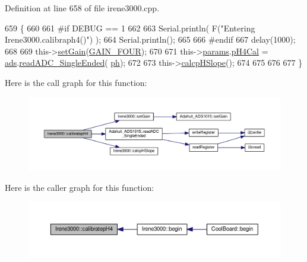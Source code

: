 Definition at line 658 of file irene3000.\+cpp.


\begin{DoxyCode}
659 \{
660 
661 \textcolor{preprocessor}{#if DEBUG == 1 }
662 
663     Serial.println( F(\textcolor{stringliteral}{"Entering Irene3000.calibraph4()"}) );
664     Serial.println();
665 
666 \textcolor{preprocessor}{#endif }
667     delay(1000);
668 
669     this->\hyperlink{class_irene3000_aff7c5da186b388e7272e63ff88a20c34}{setGain}(\hyperlink{_cool_adafruit___a_d_s1015_8h_a3d6c0e15829a207b9155890811fa4781a33fa5521f4e806b7438052fcdbbf8660}{GAIN\_FOUR});
670 
671     this->\hyperlink{class_irene3000_a136585a5ee7f9ac6ab52175fa153f8e3}{params}.\hyperlink{struct_irene3000_1_1parameters___t_a1144de6fb54eb3e1dd2a3d8c2afc97dc}{pH4Cal} =  \hyperlink{class_irene3000_a1215e77ba761c9908d80d691f149e135}{ads}.\hyperlink{class_adafruit___a_d_s1015_a40f38b9e1f3ec397c0670dd632510235}{readADC\_SingleEnded}(
      \hyperlink{_irene3000_8h_af771ceafe0e6524dd8497d4305dfe778}{ph});
672 
673     this->\hyperlink{class_irene3000_a81f6a79e546679692053f7ac1af49613}{calcpHSlope}();
674 
675 
676 
677 \}
\end{DoxyCode}
Here is the call graph for this function\+:\nopagebreak
\begin{figure}[H]
\begin{center}
\leavevmode
\includegraphics[width=350pt]{d6/d03/class_irene3000_aa140dd026922a04981edfd04d46cabbe_cgraph}
\end{center}
\end{figure}
Here is the caller graph for this function\+:\nopagebreak
\begin{figure}[H]
\begin{center}
\leavevmode
\includegraphics[width=350pt]{d6/d03/class_irene3000_aa140dd026922a04981edfd04d46cabbe_icgraph}
\end{center}
\end{figure}
\mbox{\label{class_irene3000_a1d3299202e4cb7afcff9c9e3e95d94c1}} 
